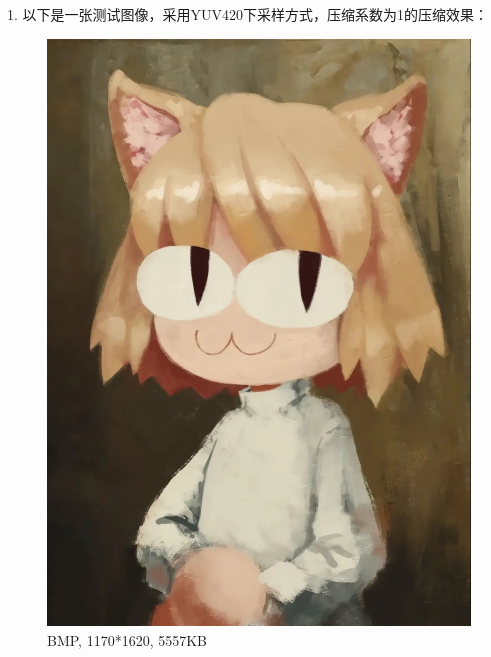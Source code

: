 \documentclass{article}
\begin{document}
1. 以下是一张测试图像，采用YUV420下采样方式，压缩系数为1的压缩效果：
\FloatBarrier
\begin{figure}[htbp]
    \centering
    \begin{minipage}[t]{0.45\textwidth}
        \centering
        \includegraphics[width=\textwidth]{assets/Test1.png}
        \caption{BMP, 1170*1620, 5557KB}
    \end{minipage}
    \hfill  %
    \begin{minipage}[t]{0.45\textwidth}
        \centering

\end{minipage}
\end{figure}
\end{document}
